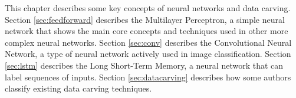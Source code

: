 
This chapter describes some key concepts of neural networks and data carving. Section \ref{sec:feedforward} describes the Multilayer Perceptron, a simple neural network that shows the  main core concepts and techniques used in other more complex neural networks. Section \ref{sec:conv} describes the Convolutional Neural Network, a type of neural network actively used in image classification. Section \ref{sec:lstm} describes the Long Short-Term Memory, a neural network that can label sequences of inputs. Section \ref{sec:datacarving} describes how some authors classify existing data carving techniques.
